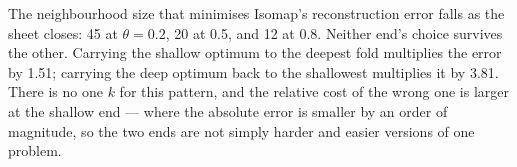 \documentclass[
  british,
  a4paper,
]{book}
\newenvironment{Shaded}{\begin{snugshade}}{\end{snugshade}}
\newcommand{\ControlFlowTok}[1]{\textcolor[rgb]{0.13,0.29,0.53}{\textbf{#1}}}
\newcommand{\FunctionTok}[1]{\textcolor[rgb]{0.13,0.29,0.53}{\textbf{#1}}}
\newcommand{\NormalTok}[1]{#1}
\newcommand{\OtherTok}[1]{\textcolor[rgb]{0.56,0.35,0.01}{#1}}
\newcommand{\SpecialCharTok}[1]{\textcolor[rgb]{0.81,0.36,0.00}{\textbf{#1}}}
\newcommand{\StringTok}[1]{\textcolor[rgb]{0.31,0.60,0.02}{#1}}
\begin{document}
\begin{Shaded}
\end{Shaded}

The neighbourhood size that minimises Isomap's reconstruction error falls as the
sheet closes: 45 at \(\theta = 0.2\), 20 at
0.5, and 12 at 0.8. Neither end's choice survives
the other. Carrying the shallow optimum to the deepest fold multiplies the error
by 1.51; carrying the deep optimum back to the
shallowest multiplies it by 3.81. There is no one
\(k\) for this pattern, and the relative cost of the wrong one is larger at the
shallow end --- where the absolute error is smaller by an order of magnitude, so
the two ends are not simply harder and easier versions of one problem.
\end{document}
